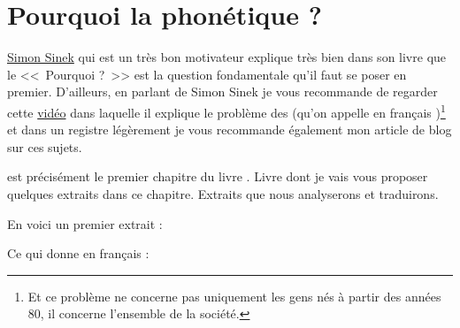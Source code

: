 \chapter{Pourquoi la phonétique ?}\label{chap:phonetic}

\href{https://fr.wikipedia.org/wiki/Simon_Sinek}{Simon Sinek} qui est
un très bon motivateur explique très bien dans son livre
\href{https://amzn.to/2qY8uMD}{} que le
<<~Pourquoi ?~>> est la question fondamentale qu'il faut se poser en
premier. D'ailleurs, en parlant de Simon Sinek je vous recommande de
regarder cette \href{https://youtu.be/hER0Qp6QJNU}{vidéo} dans
laquelle il explique le problème des  (qu'on appelle
en français )\footnote{Et ce problème ne
  concerne pas uniquement les gens nés à partir des années 80, il concerne
  l'ensemble de la société.} et dans un registre légèrement je vous
recommande également mon article de blog sur ces sujets.  

 est précisément le premier chapitre du livre
\lodge. Livre dont je vais vous proposer quelques extraits dans ce
chapitre. Extraits que nous analyserons et traduirons.

En voici un premier extrait :


\begin{center}
\begin{mdframed}[style=citestyle, frametitle={Extrait de~\cite{lodge}}]
\end{mdframed}
\end{center}
  

Ce qui donne en français :

\begin{center}
\begin{mdframed}[style=tradstyle, frametitle={\exFR{Traduction} de l'extrait ci-dessus}]
\end{mdframed}  
\end{center}

